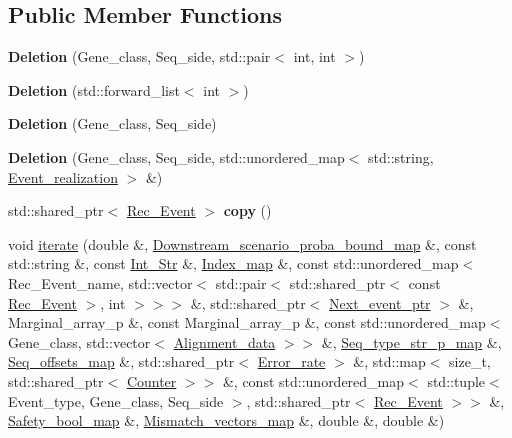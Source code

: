 \subsection*{Public Member Functions}
\begin{DoxyCompactItemize}
\item 
\mbox{\label{classDeletion_a21f9224d32bb4b21eb8ca19a42d65b9b}} 
{\bfseries Deletion} (Gene\+\_\+class, Seq\+\_\+side, std\+::pair$<$ int, int $>$)
\item 
\mbox{\label{classDeletion_a494ec4114211df7bf0a7737510709d3c}} 
{\bfseries Deletion} (std\+::forward\+\_\+list$<$ int $>$)
\item 
\mbox{\label{classDeletion_a9de4159829dc5435b8cd4dfc2962d303}} 
{\bfseries Deletion} (Gene\+\_\+class, Seq\+\_\+side)
\item 
\mbox{\label{classDeletion_a794476abcfa448bb4f38d0f3666cc91d}} 
{\bfseries Deletion} (Gene\+\_\+class, Seq\+\_\+side, std\+::unordered\+\_\+map$<$ std\+::string, \hyperlink{structEvent__realization}{Event\+\_\+realization} $>$ \&)
\item 
\mbox{\label{classDeletion_ae4e145381e8c4e51a66dd83f871d395a}} 
std\+::shared\+\_\+ptr$<$ \hyperlink{classRec__Event}{Rec\+\_\+\+Event} $>$ {\bfseries copy} ()
\item 
void \hyperlink{classDeletion_a2479968a06062e87027f8acef2631211}{iterate} (double \&, \hyperlink{classEnum__fast__memory__map}{Downstream\+\_\+scenario\+\_\+proba\+\_\+bound\+\_\+map} \&, const std\+::string \&, const \hyperlink{classInt__Str}{Int\+\_\+\+Str} \&, \hyperlink{classEnum__fast__memory__map}{Index\+\_\+map} \&, const std\+::unordered\+\_\+map$<$ Rec\+\_\+\+Event\+\_\+name, std\+::vector$<$ std\+::pair$<$ std\+::shared\+\_\+ptr$<$ const \hyperlink{classRec__Event}{Rec\+\_\+\+Event} $>$, int $>$$>$$>$ \&, std\+::shared\+\_\+ptr$<$ \hyperlink{classRec__Event}{Next\+\_\+event\+\_\+ptr} $>$ \&, Marginal\+\_\+array\+\_\+p \&, const Marginal\+\_\+array\+\_\+p \&, const std\+::unordered\+\_\+map$<$ Gene\+\_\+class, std\+::vector$<$ \hyperlink{structAlignment__data}{Alignment\+\_\+data} $>$$>$ \&, \hyperlink{classEnum__fast__memory__map}{Seq\+\_\+type\+\_\+str\+\_\+p\+\_\+map} \&, \hyperlink{classEnum__fast__memory__dual__key__map}{Seq\+\_\+offsets\+\_\+map} \&, std\+::shared\+\_\+ptr$<$ \hyperlink{classError__rate}{Error\+\_\+rate} $>$ \&, std\+::map$<$ size\+\_\+t, std\+::shared\+\_\+ptr$<$ \hyperlink{classCounter}{Counter} $>$$>$ \&, const std\+::unordered\+\_\+map$<$ std\+::tuple$<$ Event\+\_\+type, Gene\+\_\+class, Seq\+\_\+side $>$, std\+::shared\+\_\+ptr$<$ \hyperlink{classRec__Event}{Rec\+\_\+\+Event} $>$$>$ \&, \hyperlink{classEnum__fast__memory__map}{Safety\+\_\+bool\+\_\+map} \&, \hyperlink{classEnum__fast__memory__map}{Mismatch\+\_\+vectors\+\_\+map} \&, double \&, double \&)
$$
\end{DoxyCompactItemize}

